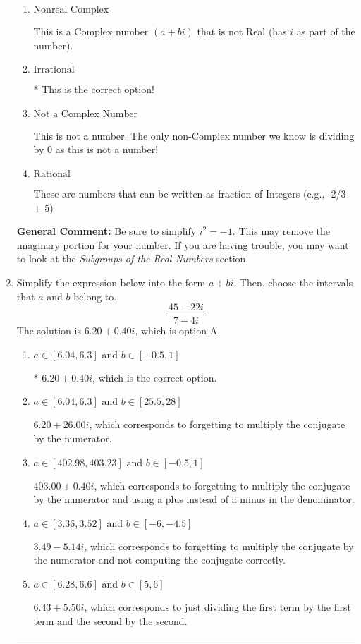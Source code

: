 \documentclass{extbook}[14pt]
\newcommand{\litem}[1]{\item #1

\rule{\textwidth}{0.4pt}}
\begin{document}
\begin{enumerate}
{\begin{enumerate}[label=\Alph*.]
This is a Complex number $(a+bi)$ that \textbf{only} has an imaginary part like $2i$.
\item \( \text{Nonreal Complex} \)

This is a Complex number $(a+bi)$ that is not Real (has $i$ as part of the number).
\item \( \text{Irrational} \)

* This is the correct option!
\item \( \text{Not a Complex Number} \)

This is not a number. The only non-Complex number we know is dividing by 0 as this is not a number!
\item \( \text{Rational} \)

These are numbers that can be written as fraction of Integers (e.g., -2/3 + 5)
\end{enumerate}

\textbf{General Comment:} Be sure to simplify $i^2 = -1$. This may remove the imaginary portion for your number. If you are having trouble, you may want to look at the \textit{Subgroups of the Real Numbers} section.
}
\litem{
Simplify the expression below into the form $a+bi$. Then, choose the intervals that $a$ and $b$ belong to.
\[ \frac{45 - 22 i}{7 - 4 i} \]The solution is \( 6.20  + 0.40 i \), which is option A.\begin{enumerate}[label=\Alph*.]
\item \( a \in [6.04, 6.3] \text{ and } b \in [-0.5, 1] \)

* $6.20  + 0.40 i$, which is the correct option.
\item \( a \in [6.04, 6.3] \text{ and } b \in [25.5, 28] \)

 $6.20  + 26.00 i$, which corresponds to forgetting to multiply the conjugate by the numerator.
\item \( a \in [402.98, 403.23] \text{ and } b \in [-0.5, 1] \)

 $403.00  + 0.40 i$, which corresponds to forgetting to multiply the conjugate by the numerator and using a plus instead of a minus in the denominator.
\item \( a \in [3.36, 3.52] \text{ and } b \in [-6, -4.5] \)

 $3.49  - 5.14 i$, which corresponds to forgetting to multiply the conjugate by the numerator and not computing the conjugate correctly.
\item \( a \in [6.28, 6.6] \text{ and } b \in [5, 6] \)

 $6.43  + 5.50 i$, which corresponds to just dividing the first term by the first term and the second by the second.
\end{enumerate}

}
\end{enumerate}
\end{document}
